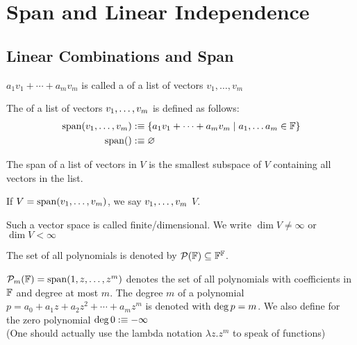 \section{Span and Linear Independence}
\subsection{Linear Combinations and Span}

\setcounter{thm}{1}
\begin{mydef} 
  $a_1 v_1 + \cdots + a_m v_m$ is called a  of a list of vectors $v_1, \dots, v_m$
\end{mydef}

\setcounter{thm}{3}
\begin{mydef} 
	The  of a list of vectors $v_1, \dots, v_m$ is defined as follows:
  \begin{equation}
    \begin{aligned}
      \operatorname{span} (v_1, \dots, v_m) &:\equiv \{a_1 v_1 + \cdots + a_m v_m \mid a_1, \dots a_m \in \mathbb{F} \}\\
      \operatorname{span} ( ) &:\equiv \varnothing
    \end{aligned}
  \end{equation}
\end{mydef}

\setcounter{thm}{5}
\begin{thm} 
  The  span of a list of vectors in $V$ is the smallest subspace of $V$ containing all vectors in the list.
\end{thm}

\begin{mydef} 
  If $V=\operatorname{span} (v_1, \dots, v_m)$, we say $v_1, \dots, v_m$  $V$.
\end{mydef}

\setcounter{thm}{8}
\begin{mydef} 
  Such a vector space is called finite\-/dimensional. We write $\dim V \neq \infty$ or $\dim V < \infty$
\end{mydef}

\begin{mydef}
  The set of all polynomials is denoted by $\mathcal{P} (\mathbb{F}) \subseteq \mathbb{F}^{\mathbb{F}}$.
\end{mydef}
\begin{mydef}
  $\mathcal{P}_m (\mathbb{F} )=\operatorname{span} (1,z,\dots,z^m)$ denotes the set of all polynomials with coefficients in $\mathbb{F}$ and degree at most $m$. The degree $m$ of a polynomial $p=a_0+a_1z+a_2z^2+\cdots+a_mz^m$ is denoted with ${\operatorname{deg} \,} p=m$.
  We also define for the zero polynomial ${\operatorname{deg} \,} 0 : \equiv -\infty$ \\
  (One should actually use the lambda notation $\lambda z.z^m$ to speak of functions)
\end{mydef}

